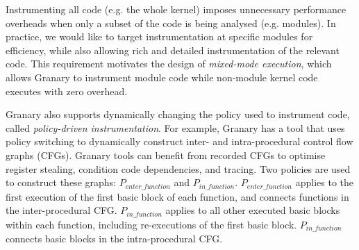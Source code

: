 \documentclass[preprint]{sigplanconf}
\begin{document}

Instrumenting all code (e.g. the whole kernel) imposes unnecessary performance overheads when only a subset of the code is being analysed (e.g. modules). In practice, we would like to target instrumentation at specific modules for efficiency, while also allowing rich and detailed instrumentation of the relevant code. This requirement motivates the design of \emph{mixed-mode execution}, which allows Granary to instrument module code while non-module kernel code executes with zero overhead.

Granary also supports dynamically changing the policy used to instrument code, called \emph{policy-driven instrumentation}. For example, Granary has a tool that uses policy switching to dynamically construct inter- and intra-procedural control flow graphs (CFGs). Granary tools can benefit from recorded CFGs to optimise register stealing, condition code dependencies, and tracing. Two policies are used to construct these graphs: $P_{enter\_function}$ and $P_{in\_function}$. $P_{enter\_function}$ applies to the first execution of the first basic block of each function, and connects functions in the inter-procedural CFG.  $P_{in\_function}$ applies to all other executed basic blocks within each function, including re-executions of the first basic block. $P_{in\_function}$ connects basic blocks in the intra-procedural CFG.
\end{document}
